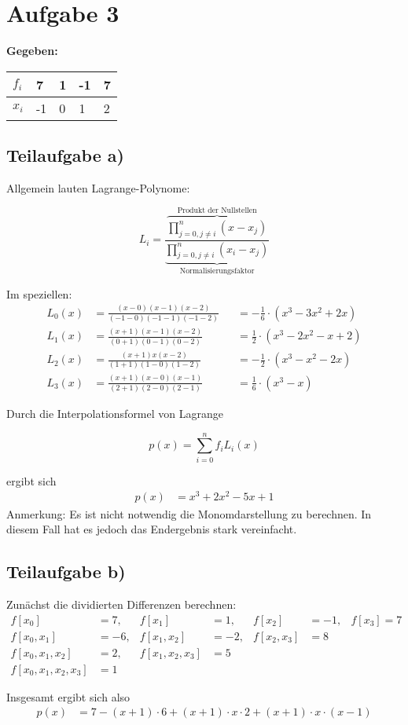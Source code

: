 \section*{Aufgabe 3}
\textbf{Gegeben:}

\begin{table}[h!]
    \begin{tabular}{l||l|l|l|l}
    $f_i$ & 7  & 1 & -1 & 7 \\\hline
    $x_i$ & -1 & 0 & 1  & 2 \\
    \end{tabular}
\end{table}

\subsection*{Teilaufgabe a)}
Allgemein lauten Lagrange-Polynome:

\[L_i = \frac{\overbrace{\prod_{j=0, j \neq i}^n (x-x_j)}^\text{Produkt der Nullstellen}}{\underbrace{\prod_{j=0, j \neq i}^n (x_i - x_j)}_\text{Normalisierungsfaktor}}\]

Im speziellen:
\begin{align}
	L_0(x) &= \frac{(x-0)(x-1)(x-2)}{(-1-0)(-1-1)(-1-2)} &&=-\frac{1}{6} \cdot (x^3 - 3 x^2 + 2x)\\
	L_1(x) &= \frac{(x+1)(x-1)(x-2)}{(0+1)(0-1)(0-2)}    &&= \frac{1}{2} \cdot (x^3 - 2x^2 - x + 2)\\
	L_2(x) &= \frac{(x+1)x(x-2)}{(1+1)(1-0)(1-2)}        &&=-\frac{1}{2} \cdot (x^3 - x^2 - 2x)\\
	L_3(x) &= \frac{(x+1)(x-0)(x-1)}{(2+1)(2-0)(2-1)}    &&= \frac{1}{6} \cdot (x^3 - x)
\end{align}

Durch die Interpolationsformel von Lagrange

\[p(x) = \sum_{i=0}^n f_i L_i(x)\]

ergibt sich
\begin{align}
	p(x) &= x^3 + 2x^2 - 5x + 1
\end{align}
Anmerkung: Es ist nicht notwendig die Monomdarstellung zu berechnen.
In diesem Fall hat es jedoch das Endergebnis stark vereinfacht.

\subsection*{Teilaufgabe b)}
Zunächst die dividierten Differenzen berechnen:
\begin{align}
	f[x_0] &= 7,           &f[x_1] &= 1,       & f[x_2] &= -1,     & f[x_3] = 7\\
	f[x_0, x_1] &= -6,     &f[x_1, x_2] &= -2, &f[x_2, x_3] &= 8\\
	f[x_0, x_1, x_2] &= 2, &f[x_1, x_2, x_3] &= 5\\
	f[x_0, x_1, x_2, x_3] &= 1
\end{align}

Insgesamt ergibt sich also
\begin{align}
	p(x) &= 7 - (x+1) \cdot 6 + (x+1) \cdot x \cdot 2 + (x+1) \cdot x \cdot (x-1)
\end{align}

